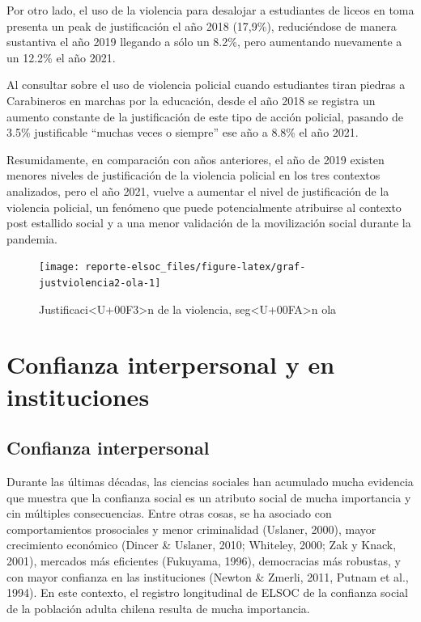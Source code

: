 \documentclass[
  12pt,
]{book}
\begin{document}
Por otro lado, el uso de la violencia para desalojar a estudiantes de liceos en toma presenta un peak de justificación el año 2018 (17,9\%), reduciéndose de manera sustantiva el año 2019 llegando a sólo un 8.2\%, pero aumentando nuevamente a un 12.2\% el año 2021.

Al consultar sobre el uso de violencia policial cuando estudiantes tiran piedras a Carabineros en marchas por la educación, desde el año 2018 se registra un aumento constante de la justificación de este tipo de acción policial, pasando de 3.5\% justificable ``muchas veces o siempre'' ese año a 8.8\% el año 2021.

Resumidamente, en comparación con años anteriores, el año de 2019 existen menores niveles de justificación de la violencia policial en los tres contextos analizados, pero el año 2021, vuelve a aumentar el nivel de justificación de la violencia policial, un fenómeno que puede potencialmente atribuirse al contexto post estallido social y a una menor validación de la movilización social durante la pandemia.

\begin{figure}

{\centering \texttt{[image: reporte-elsoc\_files/figure-latex/graf-justviolencia2-ola-1]} 

}

\caption{Justificaci<U+00F3>n de la violencia, seg<U+00FA>n ola}\label{fig:graf-justviolencia2-ola}
\end{figure}

\hypertarget{confianza-interpersonal-y-en-instituciones}{%
\section{Confianza interpersonal y en instituciones}\label{confianza-interpersonal-y-en-instituciones}}

\hypertarget{confianza-interpersonal}{%
\subsection*{Confianza interpersonal}\label{confianza-interpersonal}}

Durante las últimas décadas, las ciencias sociales han acumulado mucha evidencia que muestra que la confianza social es un atributo social de mucha importancia y cin múltiples consecuencias. Entre otras cosas, se ha asociado con comportamientos prosociales y menor criminalidad (Uslaner, 2000), mayor crecimiento económico (Dincer \& Uslaner, 2010; Whiteley, 2000; Zak y Knack, 2001), mercados más eficientes (Fukuyama, 1996), democracias más robustas, y con mayor confianza en las instituciones (Newton \& Zmerli, 2011, Putnam et al., 1994). En este contexto, el registro longitudinal de ELSOC de la confianza social de la población adulta chilena resulta de mucha importancia.
\end{document}
